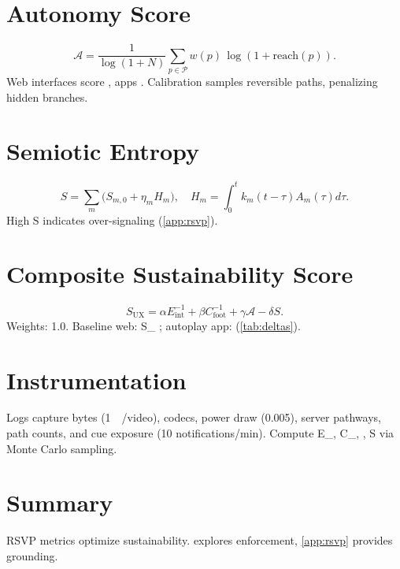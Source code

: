 \documentclass[openany]{book}
\newcommand{\Sent}{S} %
\newcommand{\Eint}{E_{\mathrm{int}}} %
\newcommand{\Cfoot}{C_{\mathrm{foot}}} %
\newcommand{\Auton}{\mathcal{A}} %
\newcommand{\SUX}{S_{\mathrm{UX}}} %
\newcommand{\kWh}{\mathrm{kWh}}
\begin{document}
\section{Autonomy Score}
\label{sec:metrics-autonomy}
\begin{equation}
\label{eq:autonomy}
\Auton = \frac{1}{\log(1+N)}\sum_{p\in \mathcal{P}} w(p)\,\log(1+\mathrm{reach}(p)).
\end{equation}
Web interfaces score \Auton{} , apps  \citep{doctorow2022}. Calibration samples reversible paths, penalizing hidden branches.

\section{Semiotic Entropy}
\label{sec:metrics-entropy}
\begin{equation}
\label{eq:metrics-S}
\Sent = \sum_m \big(S_{m,0} + \eta_m H_m\big), \quad H_m = \int_0^t k_m(t-\tau) A_m(\tau) d\tau.
\end{equation}
High \Sent{} indicates over-signaling (\cref{app:rsvp}).

\section{Composite Sustainability Score}
\label{sec:metrics-composite}
\begin{equation}
\label{eq:metrics-SUX}
\SUX = \alpha \Eint^{-1} + \beta \Cfoot^{-1} + \gamma \Auton - \delta \Sent.
\end{equation}
Weights: 1.0. Baseline web: \SUX{} ; autoplay app:  (\cref{tab:deltas}).

\section{Instrumentation}
\label{sec:instrumentation}
Logs capture bytes (\SI{1}{\mega\byte}/video), codecs, power draw (\SI{0.005}{\kWh}), server pathways, path counts, and cue exposure (10 notifications/min). Compute \Eint{}, \Cfoot{}, \Auton{}, \Sent{} via Monte Carlo sampling.

\section{Summary}
RSVP metrics optimize sustainability.  explores enforcement, \cref{app:rsvp} provides grounding.

\end{document}
